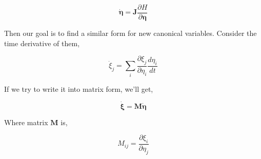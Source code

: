 \documentclass[12pt]{article}
\numberwithin{equation}{section}
\begin{document}
\begin{equation}
    \dot{\pmb{\eta}} = \pmb{J}\frac{\partial H}{\partial \pmb{\eta}}
\end{equation}

Then our goal is to find a similar form for new canonical variables. Consider the time derivative of them,

\[
    \dot{\xi}_j = \sum_{i}{\frac{\partial \xi_j}{\partial \eta_i}\frac{d \eta_i}{d t}} 
\]

If we try to write it into matrix form, we'll get,

\begin{equation}
    \dot{\pmb{\xi}} = \pmb{M} \pmb{\dot{\eta}}
\end{equation}

Where matrix $\pmb{M}$ is,

\begin{center}
    \[ M_{ij} = \frac{\partial \xi_i}{\partial \eta_j}\]
\end{center}
\end{document}
